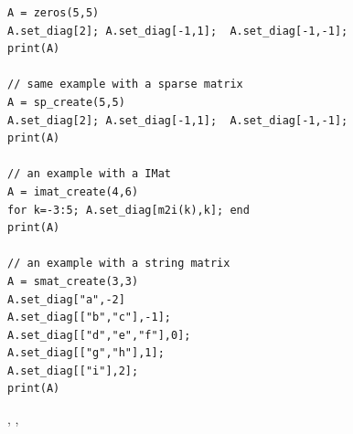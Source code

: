 \begin{examples}
\begin{Verbatim}
A = zeros(5,5)
A.set_diag[2]; A.set_diag[-1,1];  A.set_diag[-1,-1]; 
print(A)

// same example with a sparse matrix
A = sp_create(5,5)
A.set_diag[2]; A.set_diag[-1,1];  A.set_diag[-1,-1]; 
print(A)

// an example with a IMat
A = imat_create(4,6)
for k=-3:5; A.set_diag[m2i(k),k]; end
print(A)

// an example with a string matrix
A = smat_create(3,3)
A.set_diag["a",-2]
A.set_diag[["b","c"],-1]; 
A.set_diag[["d","e","f"],0]; 
A.set_diag[["g","h"],1]; 
A.set_diag[["i"],2]; 
print(A)
\end{Verbatim}
\end{examples}

\begin{manseealso}
  , , 
\end{manseealso}

